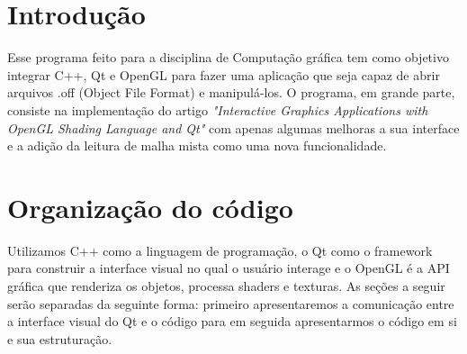 \section{Introdução}

Esse programa feito para a disciplina de Computação gráfica tem como objetivo integrar
C++, Qt e OpenGL para fazer uma aplicação que seja capaz de abrir arquivos .off (Object File Format)
e manipulá-los. O programa, em grande parte, consiste na implementação do artigo 
\emph{"Interactive Graphics Applications with OpenGL Shading Language and Qt"} com apenas algumas 
melhoras a sua interface e a adição da leitura de malha mista como uma nova funcionalidade.

\section{Organização do código}

Utilizamos C++ como a linguagem de programação, o Qt como o framework para 
construir a interface visual no qual o usuário interage e o OpenGL é a API gráfica que renderiza
os objetos, processa shaders e texturas. As seções a seguir serão separadas da seguinte forma: primeiro
apresentaremos a comunicação entre a interface visual do Qt e o código para em seguida apresentarmos o código 
em si e sua estruturação.